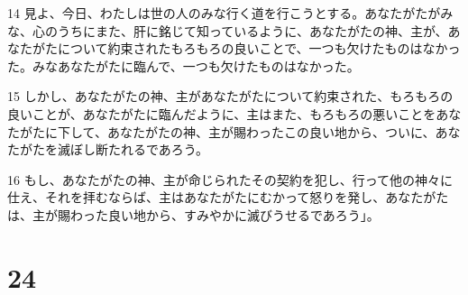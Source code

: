 \par 14 見よ、今日、わたしは世の人のみな行く道を行こうとする。あなたがたがみな、心のうちにまた、肝に銘じて知っているように、あなたがたの神、主が、あなたがたについて約束されたもろもろの良いことで、一つも欠けたものはなかった。みなあなたがたに臨んで、一つも欠けたものはなかった。
\par 15 しかし、あなたがたの神、主があなたがたについて約束された、もろもろの良いことが、あなたがたに臨んだように、主はまた、もろもろの悪いことをあなたがたに下して、あなたがたの神、主が賜わったこの良い地から、ついに、あなたがたを滅ぼし断たれるであろう。
\par 16 もし、あなたがたの神、主が命じられたその契約を犯し、行って他の神々に仕え、それを拝むならば、主はあなたがたにむかって怒りを発し、あなたがたは、主が賜わった良い地から、すみやかに滅びうせるであろう」。

\chapter{24}

